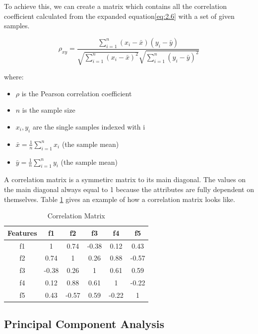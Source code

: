 \documentclass[11pt]{article} %
\theoremstyle{plain}
\theoremstyle{definition}
\begin{document}
To achieve this, we can create a matrix which contains all the correlation coefficient calculated from the expanded equation\eqref{eq:2.6} with a set of given samples.

{
  \begin{equation}
    \label{eq:2.6}
    \tag{2.6}
    {\rho_{xy}={\frac {\sum _{i=1}^{n}(x_{i}-{\bar {x}})(y_{i}-{\bar {y}})}{{\sqrt {\sum _{i=1}^{n}(x_{i}-{\bar {x}})^{2}}}{\sqrt {\sum _{i=1}^{n}(y_{i}-{\bar {y}})^{2}}}}}}
  \end{equation}

  \footnotesize
  where:
  \begin{itemize}[label=-, leftmargin=4em, itemsep=0.1em]
    \item ${\rho}$ is the Pearson correlation coefficient
    \item ${n}$ is the sample size
    \item $x_{i}, y_{i}$ are the single samples indexed with i
    \item ${\bar {x}}={\frac {1}{n}}\sum _{i=1}^{n}x_{i}$ (the sample mean)
    \item ${\bar {y}}={\frac {1}{n}}\sum _{i=1}^{n}y_{i}$ (the sample mean)
  \end{itemize}
}

A correlation matrix is a symmetirc matrix to its main diagonal. The values on the main diagonal always equal to 1 because the attributes are fully dependent on themselves. Table \ref{table:cormat} gives an example of how a correlation matrix looks like.

{
  \begin{table}[ht]
    \centering
    \begin{tabular}{|c|c c c c c|}
      \hline
      Features & f1 & f2 & f3 & f4 & f5 \\ [0.5ex]
      \hline
      f1 & 1 & 0.74 & -0.38 & 0.12 & 0.43 \\
      \hline
      f2 & 0.74 & 1 & 0.26 & 0.88 & -0.57 \\
      \hline
      f3 & -0.38 & 0.26 & 1 & 0.61 & 0.59 \\
      \hline
      f4 & 0.12 & 0.88 & 0.61 & 1 & -0.22 \\
      \hline
      f5 & 0.43 & -0.57 & 0.59 & -0.22 & 1 \\
      \hline
    \end{tabular}
    \caption{Correlation Matrix}
    \label{table:cormat}
  \end{table}
}

\subsection{Principal Component Analysis}
\end{document}
